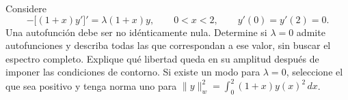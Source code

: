 Considere
\[
-\big[(1+x)y'\big]'=\lambda(1+x)y,\qquad0<x<2,\qquad y'(0)=y'(2)=0.
\]
Una autofunción debe ser no idénticamente nula. Determine si \(\lambda=0\) admite autofunciones y describa todas las que correspondan a ese valor, sin buscar el espectro completo. Explique qué libertad queda en su amplitud después de imponer las condiciones de contorno. Si existe un modo para \(\lambda=0\), seleccione el que sea positivo y tenga norma uno para
\(\|y\|_w^2=\int_0^2(1+x)y(x)^2\,dx\).
